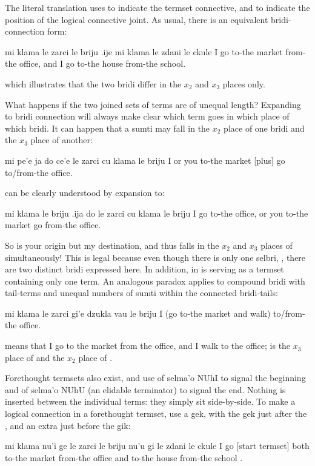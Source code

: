 The literal translation uses \q{[plus]} to indicate the
    termset connective, and \q{[joint]} to indicate the position of
    the logical connective joint. As usual, there is an equivalent
    bridi-connection form:
\begin{example}
mi klama le zarci le briju\n
\T	.ije mi klama le zdani le ckule\n
I go to-the market from-the office,\n
\T	and I go to-the house from-the school.
\end{example}

{\noindent}which illustrates that the two bridi differ in the $x_2$ and $x_3$
    places only. 

What happens if the two joined sets of terms are of unequal
    length? Expanding to bridi connection will always make clear
    which term goes in which place of which bridi. It can happen
    that a sumti may fall in the $x_2$ place of one bridi and the $x_3$
    place of another:
\begin{example}
mi pe'e ja do ce'e le zarci\n
\T	cu klama le briju\n
I  or you to-the market [plus]\n
\T	go to/from-the office.
\end{example}

{\noindent}can be clearly understood by expansion to:
\begin{example}
mi klama le briju\n
\T	.ija do le zarci cu klama le briju\n
I go to-the office,\n
\T	or you to-the market go from-the office.
\end{example}

So  is your origin but my destination, and thus
    falls in the $x_2$ and $x_3$ places of  simultaneously! This
    is legal because even though there is only one selbri,
    , there are two distinct bridi expressed here. In
    addition,  in  is
    serving as a termset containing only one term. An analogous
    paradox applies to compound bridi with tail-terms and unequal
    numbers of sumti within the connected bridi-tails:
\begin{example}
\T	mi klama le zarci gi'e dzukla vau le briju\n
I (go to-the market and walk) to/from-the office.
\end{example}

{\noindent}means that I go to the market from the office, and I walk to
    the office;  is the $x_3$ place of  and the
    $x_2$ place of . 

Forethought termsets also exist, and use  of selma'o
    NUhI to signal the beginning and  of selma'o NUhU (an
    elidable terminator) to signal the end. Nothing is inserted
    between the individual terms: they simply sit side-by-side. To
    make a logical connection in a forethought termset, use a gek,
    with the gek just after the , and an extra 
    just before the gik:
\begin{example}
mi klama nu'i ge le zarci le briju\n
\T	nu'u gi le zdani le ckule \n
I go [start termset] both to-the market from-the office\n
\T	[joint] and to-the house from-the school\n
{}.
\end{example}

